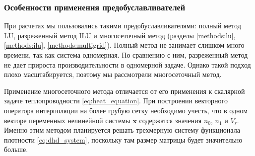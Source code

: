 \subsubsection*{Особенности применения предобуславливателей}
При расчетах мы пользовались такими предобуславливателями: полный метод LU, разреженный метод ILU и многосеточный метод (разделы \ref{methods:lu}, \ref{methods:ilu}, \ref{methods:multigrid}). Полный метод не занимает слишком много времени, так как система одномерная. По сравнению с ним, разреженный метод не дает прироста производительности в одномерной задаче. Однако такой подход плохо масштабируется, поэтому мы рассмотрели многосеточный метод.
\par
Применение многосеточного метода отличается от его применения к скалярной задаче теплопроводности \eqref{eq:heat_equation}. При построении векторного оператора интерполяции на более грубую сетку необходимо учесть, что в одном векторе переменных нелинейной системы $\mathbf{x}$ содержатся значения $n_0$, $n_1$ и $V_r$. Именно этим методом планируется решать трехмерную систему функционала плотности \eqref{eq:dhd_system}, поскольку там размер матрицы будет значительно больше.


